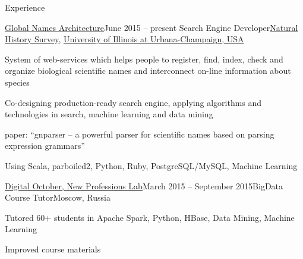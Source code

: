 \documentclass{resume} %
\begin{document}
\begin{rSection}{Experience}

\begin{samepage}
\begin{rSubsection}{\href{http://globalnames.org/}{Global Names Architecture}}{June 2015 -- present}
{Search Engine Developer}{\href{http://www.inhs.illinois.edu/}{Natural History Survey},
\href{http://illinois.edu/}{University of Illinois at Urbana-Champaign, USA}}
\item System of web-services which helps people to register, find, index, check and organize
biological scientific names and interconnect on-line information about species
\item Co-designing production-ready search engine, applying algorithms and technologies in search,
machine learning and data mining
\item paper: ``gnparser -- a powerful parser for scientific names based on parsing expression
grammars''
\item Using Scala, parboiled2, Python, Ruby, PostgreSQL/MySQL, Machine Learning
\end{rSubsection}
\end{samepage}

\pagebreak

\begin{samepage}
\begin{rSubsection}{\href{http://newprolab.com/bigdata/eng/}{Digital October, New Professions Lab}}{March 2015 -- September 2015}{BigData Course Tutor}{Moscow, Russia}
\item Tutored 60+ students in Apache Spark, Python, HBase, Data Mining, Machine Learning
\item Improved course materials
\end{rSubsection}
\end{samepage}



\end{rSection}
\end{document}
